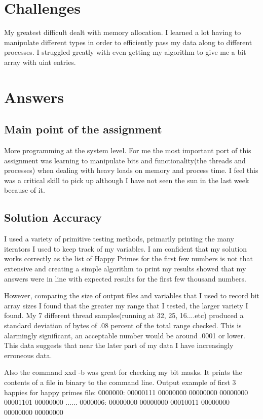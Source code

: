 \documentclass[letterpaper,10pt,titlepage]{article}
\begin{document}
\section{Challenges}
My greatest difficult dealt with memory allocation. I learned a lot having to manipulate different types in order to efficiently pass my data
along to different processes. I struggled greatly with even getting my algorithm to give me a bit array with uint entries.


\section{Answers}
\subsection{Main point of the assignment}
More programming at the system level. For me the most important port of this assignment was learning to manipulate
bits and functionality(the threads and processes) when dealing with heavy loads on memory and process time. I feel this
was a critical skill to pick up although I have not seen the sun in the last week because of it.

\subsection{Solution Accuracy}
I used a variety of primitive testing methods, primarily printing the many iterators I used to keep track of my variables.
I am confident that my solution works correctly as the list of Happy Primes for the first few numbers is not that extensive and creating a simple algorithm
to print my results showed that my answers were in line with expected results for the first few thousand numbers.

However, comparing the size of output files and variables that I used to record bit array sizes I found that the greater my range that I tested,
the larger variety I found.
My 7 different thread samples(running at 32, 25, 16....etc) produced a standard deviation of bytes of .08 percent of the total range checked.
This is alarmingly significant, an acceptable number would be around .0001 or lower. This data suggests that near the later part
of my data I have increasingly erroneous data.


Also the command xxd -b was great for checking my bit masks. It prints the contents of a file in binary to the command line.
Output example of first 3 happies for happy primes file:
0000000: 00000111 00000000 00000000 00000000 00001101 00000000  ......
0000006: 00000000 00000000 00010011 00000000 00000000 00000000 
\end{document}
